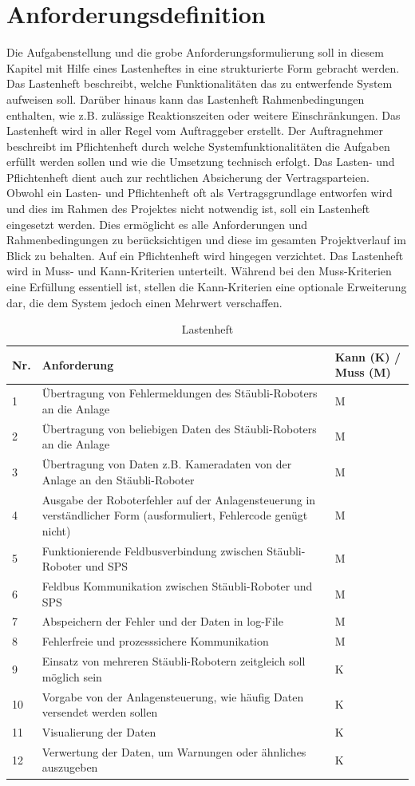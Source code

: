 \documentclass[ a4paper,
                oneside,
                toc=bibliography,
                toc=listof
                ]{scrbook}
\begin{document}
	\chapter{Anforderungsdefinition}
	Die Aufgabenstellung und die grobe Anforderungsformulierung soll in diesem Kapitel mit Hilfe eines Lastenheftes in eine strukturierte Form gebracht werden. Das Lastenheft beschreibt, welche Funktionalitäten das zu entwerfende System aufweisen soll. Darüber hinaus kann das Lastenheft Rahmenbedingungen enthalten, wie z.B. zulässige Reaktionszeiten oder weitere Einschränkungen. Das Lastenheft wird in aller Regel vom Auftraggeber erstellt. Der Auftragnehmer beschreibt im Pflichtenheft durch welche Systemfunktionalitäten die Aufgaben erfüllt werden sollen und wie die Umsetzung technisch erfolgt. Das Lasten- und Pflichtenheft dient auch zur rechtlichen Absicherung der Vertragsparteien. Obwohl ein Lasten- und Pflichtenheft oft als Vertragsgrundlage entworfen wird und dies im Rahmen des Projektes nicht notwendig ist, soll ein Lastenheft eingesetzt werden. Dies ermöglicht es alle Anforderungen und Rahmenbedingungen zu berücksichtigen und diese im gesamten Projektverlauf im Blick zu behalten. Auf ein Pflichtenheft wird hingegen verzichtet. \cite{SoftwaretechnikBroy}
	Das Lastenheft wird in Muss- und Kann-Kriterien unterteilt. Während bei den Muss-Kriterien eine Erfüllung essentiell ist, stellen die Kann-Kriterien eine optionale Erweiterung dar, die dem System jedoch einen Mehrwert verschaffen.\\
	\begin{longtable}{|p{1cm}|p{10cm}|p{2cm}|}
		\caption{Lastenheft}
		\label{table:Lastenheft}\\
		\hline
		Nr. & Anforderung & Kann (K) / Muss (M) \\ [0.5ex] 
		\hline
		\endhead
		1 & Übertragung von Fehlermeldungen des Stäubli-Roboters an die Anlage & M  \\ 
		2 & Übertragung von beliebigen Daten des Stäubli-Roboters an die Anlage & M  \\
		3 & Übertragung von Daten z.B. Kameradaten von der Anlage an den Stäubli-Roboter & M  \\
		4 & Ausgabe der Roboterfehler auf der Anlagensteuerung in verständlicher Form (ausformuliert, Fehlercode genügt nicht) & M  \\
		5 & Funktionierende Feldbusverbindung zwischen Stäubli-Roboter und SPS & M  \\
		6 & Feldbus Kommunikation zwischen Stäubli-Roboter und SPS & M  \\  
		7 & Abspeichern der Fehler und der Daten in log-File & M  \\ 
		8 & Fehlerfreie und prozesssichere Kommunikation & M  \\ 
		\hline
		9 & Einsatz von mehreren Stäubli-Robotern zeitgleich soll möglich sein & K  \\
		10 & Vorgabe von der Anlagensteuerung, wie häufig Daten versendet werden sollen & K  \\ 
		11 & Visualierung der Daten & K  \\
		12 & Verwertung der Daten, um Warnungen oder ähnliches auszugeben & K  \\  
		\hline
	\end{longtable}
	
\end{document}
